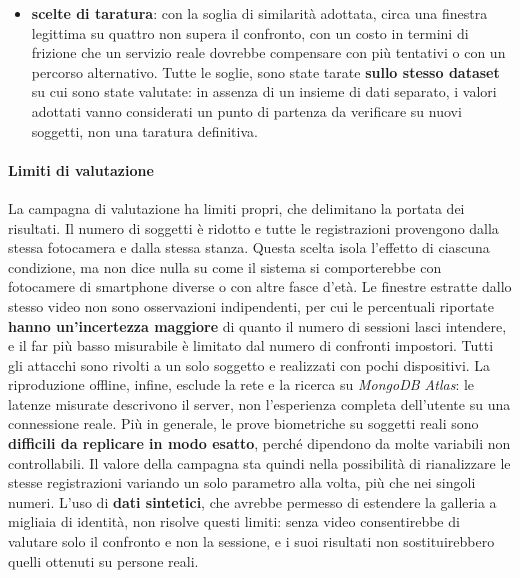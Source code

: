 \begin{itemize}
    \item \textbf{scelte di taratura}: con la soglia di similarità adottata, circa una finestra legittima su quattro non supera il confronto, con un costo in termini di frizione che un servizio reale dovrebbe compensare con più tentativi o con un percorso alternativo. 
    Tutte le soglie, sono state tarate \textbf{sullo stesso dataset} su cui sono state valutate: in assenza di un insieme di dati separato, i valori adottati vanno considerati un punto di partenza da verificare su nuovi soggetti, non una taratura definitiva.
\end{itemize}

\paragraph{Limiti di valutazione}
La campagna di valutazione ha limiti propri, che delimitano la portata dei risultati.
Il numero di soggetti è ridotto e tutte le registrazioni provengono dalla stessa fotocamera e dalla stessa stanza.
Questa scelta isola l'effetto di ciascuna condizione, ma non dice nulla su come il sistema si comporterebbe con fotocamere di smartphone diverse o con altre fasce d'età.
Le finestre estratte dallo stesso video non sono osservazioni indipendenti, per cui le percentuali riportate \textbf{hanno un'incertezza maggiore} di quanto il numero di sessioni lasci intendere, e il \gls{far} più basso misurabile è limitato dal numero di confronti impostori.
Tutti gli attacchi sono rivolti a un solo soggetto e realizzati con pochi dispositivi.
La riproduzione offline, infine, esclude la rete e la ricerca su \textit{MongoDB Atlas}: le latenze misurate descrivono il server, non l'esperienza completa dell'utente su una connessione reale.
Più in generale, le prove biometriche su soggetti reali sono \textbf{difficili da replicare in modo esatto}, perché dipendono da molte variabili non controllabili.
Il valore della campagna sta quindi nella possibilità di rianalizzare le stesse registrazioni variando un solo parametro alla volta, più che nei singoli numeri.
L'uso di \textbf{dati sintetici}, che avrebbe permesso di estendere la galleria a migliaia di identità, non risolve questi limiti: senza video consentirebbe di valutare solo il confronto e non la sessione, e i suoi risultati non sostituirebbero quelli ottenuti su persone reali.

